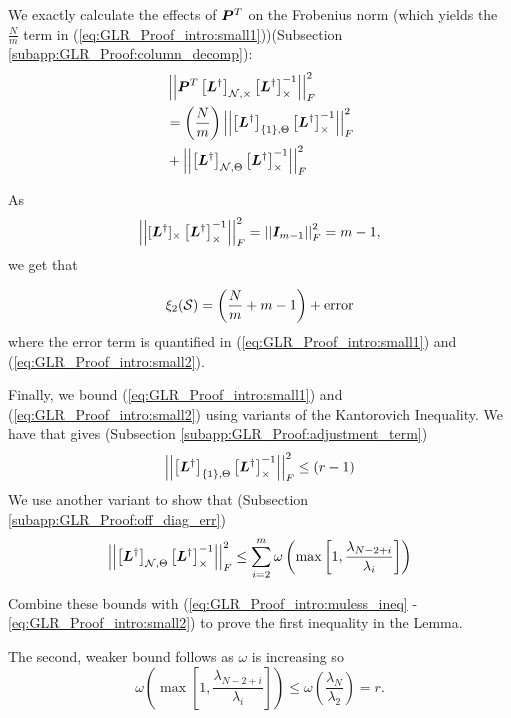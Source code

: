 We exactly calculate the effects of $\bm{P}^{T}$ on the Frobenius norm (which yields the $\frac{N}{m}$ term in (\ref{eq:GLR_Proof_intro:small1}))(Subsection \ref{subapp:GLR_Proof:column_decomp}):
\begin{align}
    &\sqfrob{\matr{P}^{T}\msub[N,\Theta]{\matr{L}^{\dagger}}\msub[\Theta]{\matr{L}^{\dagger}}^{-1}} \\
    &= \left(\frac{N}{m} \right) \sqfrob{\msubgen[\{1\},\Theta]{\matr{L}^{\dagger}}\msub[\Theta]{\matr{L}^{\dagger}}^{-1}} \label{eq:GLR_Proof_intro:small1}\\
    &+ \sqfrob{\msubgen[\set{N},\Theta]{\matr{L}^{\dagger}}\msub[\Theta]{\matr{L}^{\dagger}}^{-1}} \label{eq:GLR_Proof_intro:small2}
\end{align}

As 
\begin{equation}
\sqfrob{\matrsubpow[\Theta]{L}{\dagger}\msub[\Theta]{\matr{L}^{\dagger}}^{-1}} = \sqfrob{\matr{I}_{m-1}} = m-1,
\end{equation} we get that

\begin{equation}
    \xi_{2}(\mathcal{S}) = \left(\frac{N}{m} + m - 1\right) + \textrm{error}
\end{equation}
where the error term is quantified in (\ref{eq:GLR_Proof_intro:small1}) and (\ref{eq:GLR_Proof_intro:small2}).

Finally, we bound (\ref{eq:GLR_Proof_intro:small1}) and (\ref{eq:GLR_Proof_intro:small2}) using variants of the Kantorovich Inequality. We have that \cite[Eq. 20-23]{householder1965kantorovich} gives (Subsection \ref{subapp:GLR_Proof:adjustment_term})
\begin{equation}
    \sqfrob{\msubgen[\{1\},\Theta]{\matr{L}^{\dagger}}\msub[\Theta]{\matr{L}^{\dagger}}^{-1}} \leq (r-1)
\end{equation}
We use another variant to show that (Subsection  \ref{subapp:GLR_Proof:off_diag_err})
\begin{equation}
    \sqfrob{\msubgen[\set{N},\Theta]{\matr{L}^{\dagger}}\msub[\Theta]{\matr{L}^{\dagger}}^{-1}} \leq \sum^{m}_{i=2}\omega \left( \max\left[1,\frac{\lambda_{N-2+i}}{\lambda_{i}}\right] \right)
\end{equation}

Combine these bounds with (\ref{eq:GLR_Proof_intro:muless_ineq} - \ref{eq:GLR_Proof_intro:small2}) to prove the first inequality in the Lemma.

The second, weaker bound follows as $\omega$ is increasing so 
\begin{equation}
    \omega \left( \max\left[1,\frac{\lambda_{N-2+i}}{\lambda_{i}}\right] \right) \leq \omega\left(\frac{\lambda_{N}}{\lambda_{2}}\right) =r.
\end{equation}

